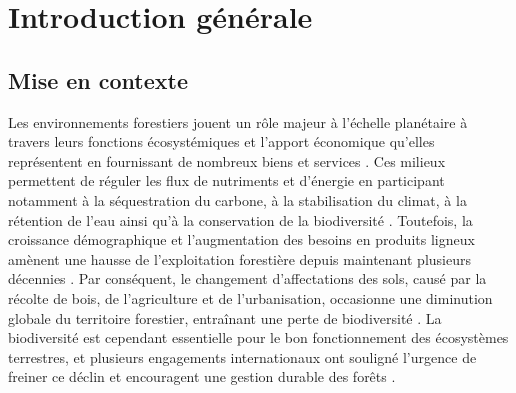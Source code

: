 \chapter*{Introduction générale}         %
\label{chap-introduction}       %


\section*{Mise en contexte}
\label{sec:contexte}

Les environnements forestiers jouent un rôle majeur à l’échelle planétaire à travers leurs fonctions écosystémiques et l'apport économique qu’elles représentent en fournissant de nombreux biens et services \citep{Balvanera2006Quantifyingevidence}. 
Ces milieux permettent de réguler les flux de nutriments et d’énergie en participant notamment à la séquestration du carbone, à la stabilisation du climat, à la rétention de l’eau ainsi qu’à la conservation de la biodiversité \citep{Balvanera2006Quantifyingevidence,Diaz2006BiodiversityLoss,Canadell2008Managingforests,Pawson2013Plantationforests}. 
Toutefois, la croissance démographique et l’augmentation des besoins en produits ligneux amènent une hausse de l’exploitation forestière depuis maintenant plusieurs décennies \citep{Foley2005GlobalConsequences}. 
Par conséquent, le changement d’affectations des sols, causé par la récolte de bois, de l’agriculture et de l’urbanisation, occasionne une diminution globale du territoire forestier, entraînant une perte de biodiversité \citep{Bengtsson2000Biodiversitydisturbances,Sala2000Globalbiodiversity,Naeem2012functionsbiological,Bichet2016Maintaininganimal}. 
La biodiversité est cependant essentielle pour le bon fonctionnement des écosystèmes terrestres, et plusieurs engagements internationaux ont souligné l'urgence de freiner ce déclin et encouragent une gestion durable des forêts \citep{Newbold2015Globaleffects}. 

